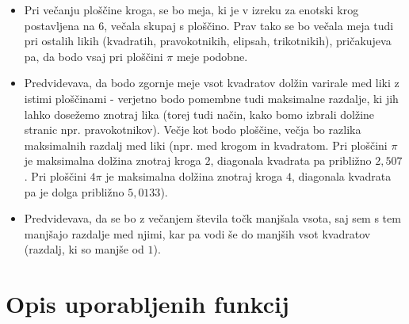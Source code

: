 \documentclass[a4paper]{article}
\begin{document}
\begin{itemize}
\item Pri večanju ploščine kroga, se bo meja, ki je v izreku za enotski krog postavljena na $6$, večala skupaj s ploščino. Prav tako se bo večala meja tudi pri ostalih likih (kvadratih, pravokotnikih, elipsah, trikotnikih), pričakujeva pa, da bodo vsaj pri ploščini $\pi$ meje podobne. 
\item Predvidevava, da bodo zgornje meje vsot kvadratov dolžin varirale med liki z istimi ploščinami - verjetno bodo pomembne tudi maksimalne razdalje, ki jih lahko dosežemo znotraj lika (torej tudi način, kako bomo izbrali dolžine stranic npr. pravokotnikov). Večje kot bodo ploščine, večja bo razlika maksimalnih razdalj med liki (npr. med krogom in kvadratom. Pri ploščini $\pi$ je maksimalna dolžina znotraj kroga $2$, diagonala kvadrata pa približno $2,507$. Pri ploščini $4\pi$ je maksimalna dolžina znotraj kroga $4$, diagonala kvadrata pa je dolga približno $5,0133$). 
\item Predvidevava, da se bo z večanjem števila točk manjšala vsota, saj sem s tem manjšajo razdalje med njimi, kar pa vodi še do manjših vsot kvadratov (razdalj, ki so manjše od $1$).
\end{itemize}


\section{Opis uporabljenih funkcij}
\end{document}
